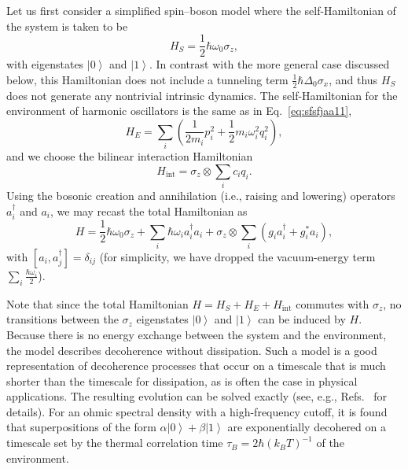 \documentclass[3p,sort&compress,12pt]{elsarticle}
\newcommand{\ket}[1]{\left\vert{#1}\right\rangle}
\newcommand{\op}[1]{#1}
\begin{document}
Let us first consider a simplified spin--boson model where the  self-Hamiltonian of the system is taken to be  
%
\begin{equation}
\op{H}_S = \frac{1}{2} \hbar\omega_0 \sigma_z,
\end{equation}
%
 with eigenstates $\ket{0}$ and $\ket{1}$. In contrast with the more general case discussed below, this Hamiltonian does not include a tunneling term $\frac{1}{2}\hbar \Delta_0 \sigma_x$, and thus $\op{H}_S$ does not generate any nontrivial intrinsic dynamics. The self-Hamiltonian for the environment of harmonic oscillators is the same as in Eq.~\eqref{eq:sfsfjaa11},
%
\begin{equation}
  \op{H}_E = \sum_i \left( \frac{1}{2m_i}p_i^2 +
  \frac{1}{2}m_i\omega_i^2q_i^2 \right),  
\end{equation}
%
 and we choose the bilinear interaction Hamiltonian 
%
\begin{equation}
\op{H}_\text{int} =   \sigma_z \otimes \sum_i c_i q_i.
\end{equation}
%
Using the bosonic creation and annihilation (i.e., raising and lowering) operators $a_i^\dagger$ and $a_i$, we may recast the total Hamiltonian as
%
\begin{equation}\label{eq:h-ssb}
  H =  \frac{1}{2}\hbar \omega_0 \sigma_z 
  + \sum_i \hbar\omega_i a_i^\dagger a_i + \sigma_z \otimes  \sum_i 
  \left( g_ia_i^\dagger + g_i^* a_i \right),
\end{equation}
%
with $[a_i, a_j^\dagger]=\delta_{ij}$ (for simplicity, we have dropped the vacuum-energy term $\sum_i \frac{\hbar\omega_i}{2}$).

Note that since the total Hamiltonian $H=H_S+H_E+H_\text{int}$ commutes with $\sigma_z$, no transitions between the $\sigma_z$ eigenstates $\ket{0}$ and $\ket{1}$ can be induced by $H$. Because there is no energy exchange between the system and the environment, the model describes decoherence without dissipation. Such a model is a good representation of decoherence processes that occur on a timescale that is much shorter than the timescale for dissipation, as is often the case in physical applications. The resulting evolution can be solved exactly (see, e.g., Refs.~\cite{Schlosshauer:2007:un,Hornberger:2009:aq} for details). For an ohmic spectral density with a high-frequency cutoff, it is found that superpositions of the form $\alpha\ket{0}+\beta\ket{1}$ are exponentially decohered on a timescale set by the thermal correlation time $\tau_B=2\hbar (k_B T)^{-1}$ of the environment.
\end{document}
